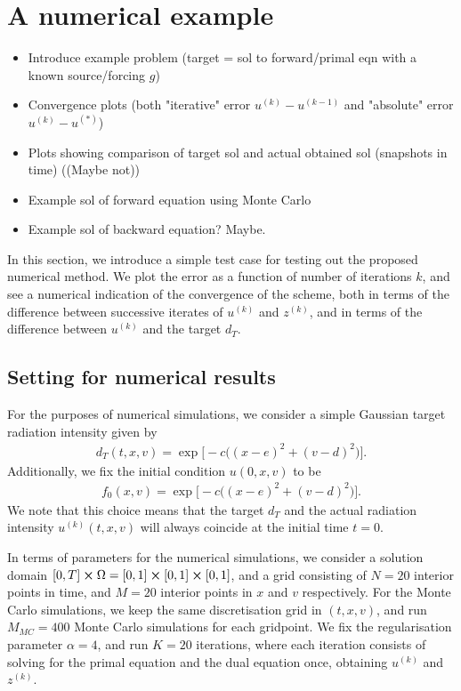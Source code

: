 \section{A numerical example}\label{sec:numerical}
\begin{itemize}
    \item Introduce example problem (target = sol to forward/primal eqn with a known source/forcing $g$)
    \item Convergence plots (both "iterative" error $u^{(k)} - u^{(k-1)}$ and "absolute" error $u^{(k)}-u^{(*)}$)
    \item Plots showing comparison of target sol and actual obtained sol (snapshots in time) ((Maybe not))
    \item Example sol of forward equation using Monte Carlo
    \item Example sol of backward equation? Maybe.
\end{itemize}

In this section, we introduce a simple test case for testing out the proposed numerical method. We plot the error as a function of number of iterations $k$, and see a numerical indication of the convergence of the scheme, both in terms of the difference between successive iterates of $u^{(k)}$ and $z^{(k)}$, and in terms of the difference between $u^{(k)}$ and the target $d_T$.

\subsection{Setting for numerical results}
For the purposes of numerical simulations, we consider a simple Gaussian target radiation intensity given by
%
\begin{align}
    d_T(t,x,v) = \exp\Big[ -c\big( {(x-e)}^2 + {(v-d)}^2 \big) \Big].
\end{align}
%
Additionally, we fix the initial condition $u(0,x,v)$ to be 
%
\begin{align}
    f_0(x,v) = \exp\Big[ -c\big( {(x-e)}^2 + {(v-d)}^2 \big) \Big].
\end{align}
%
We note that this choice means that the target $d_T$ and the actual radiation intensity $u^{(k)}(t,x,v)$ will always coincide at the initial time $t=0$. 

In terms of parameters for the numerical simulations, we consider a solution domain $[0,T]\cross \Omega = [0,1]\cross[0,1]\cross[0,1]$, and a grid consisting of $N=20$ interior points in time, and $M=20$ interior points in $x$ and $v$ respectively. For the Monte Carlo simulations, we keep the same discretisation grid in $(t,x,v)$, and run $M_{MC}=400$ Monte Carlo simulations for each gridpoint. We fix the regularisation parameter $\alpha=4$, and run $K=20$ iterations, where each iteration consists of solving for the primal equation and the dual equation once, obtaining $u^{(k)}$ and $z^{(k)}$.

